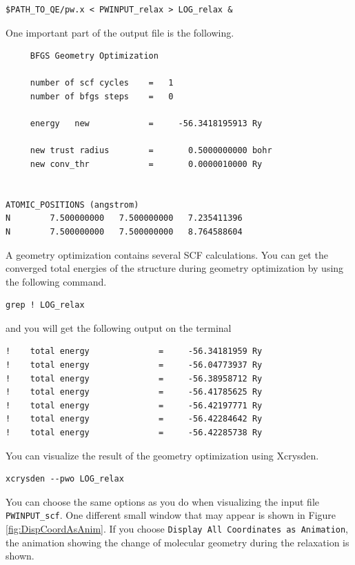 \documentclass[12pt,english]{paper}
\begin{document}
\begin{lstlisting}
$PATH_TO_QE/pw.x < PWINPUT_relax > LOG_relax &
\end{lstlisting}


One important part of the output file is the following.

\begin{lstlisting}
     BFGS Geometry Optimization

     number of scf cycles    =   1
     number of bfgs steps    =   0

     energy   new            =     -56.3418195913 Ry

     new trust radius        =       0.5000000000 bohr
     new conv_thr            =       0.0000010000 Ry


ATOMIC_POSITIONS (angstrom)
N        7.500000000   7.500000000   7.235411396
N        7.500000000   7.500000000   8.764588604
\end{lstlisting}


A geometry optimization contains several SCF calculations. You can
get the converged total energies of the structure during geometry
optimization by using the following command.

\begin{lstlisting}
grep ! LOG_relax
\end{lstlisting}
and you will get the following output on the terminal

\begin{lstlisting}
!    total energy              =     -56.34181959 Ry
!    total energy              =     -56.04773937 Ry
!    total energy              =     -56.38958712 Ry
!    total energy              =     -56.41785625 Ry
!    total energy              =     -56.42197771 Ry
!    total energy              =     -56.42284642 Ry
!    total energy              =     -56.42285738 Ry
\end{lstlisting}


You can visualize the result of the geometry optimization using Xcrysden.

\begin{lstlisting}
xcrysden --pwo LOG_relax
\end{lstlisting}


You can choose the same options as you do when visualizing the input
file \texttt{PWINPUT\_scf}. One different small window that may appear
is shown in Figure \ref{fig:DispCoordAsAnim}. If you choose \texttt{Display
All Coordinates as Animation}, the animation showing the change of
molecular geometry during the relaxation is shown.
\end{document}
